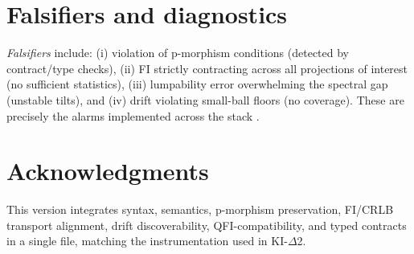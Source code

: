\documentclass[11pt]{article}
\theoremstyle{plain}
\theoremstyle{definition}
\theoremstyle{remark}
\newcommand{\1}{\mathbbm{1}}
\begin{document}
\section{Falsifiers and diagnostics}
\emph{Falsifiers} include: (i) violation of p-morphism conditions (detected by contract/type checks), (ii) FI strictly contracting across all projections of interest (no sufficient statistics), (iii) lumpability error overwhelming the spectral gap (unstable tilts), and (iv) drift violating small-ball floors (no coverage). These are precisely the alarms implemented across the stack \parencite{elliott2025idiom,elliott2025qfi,elliott2025drift,elliott2025flow}.

\section*{Acknowledgments}
This version integrates syntax, semantics, p-morphism preservation, FI/CRLB transport alignment, drift discoverability, QFI-compatibility, and typed contracts in a single file, matching the instrumentation used in KI-\(\Delta\)2.

\printbibliography
\end{document}
